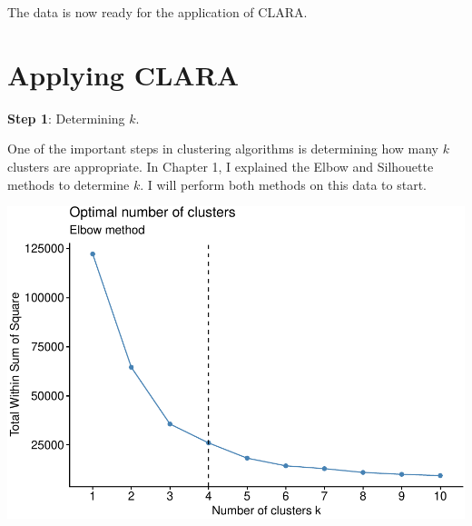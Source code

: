 \documentclass[12pt,twoside]{amherstthesis}
\begin{document}
  The data is now ready for the application of CLARA.
  
  \section{Applying CLARA}\label{applying-clara}
  
  \textbf{Step 1}: Determining \(k\).
  
  One of the important steps in clustering algorithms is determining how
  many \(k\) clusters are appropriate. In Chapter 1, I explained the Elbow
  and Silhouette methods to determine \(k\). I will perform both methods
  on this data to start.
  
  \begin{Shaded}
  \begin{Highlighting}[]
   \NormalTok{) }\OperatorTok{+}
  \StringTok{    }\NormalTok{(} \NormalTok{, } \NormalTok{)}\OperatorTok{+}
  \StringTok{  }\NormalTok{(} \NormalTok{)}
  \end{Highlighting}
  \end{Shaded}
  
  \begin{center}\includegraphics{Comps_Proj_files/figure-latex/unnamed-chunk-5-1} \end{center}
  
  \begin{Shaded}
  \begin{Highlighting}[]
   \NormalTok{) }\OperatorTok{+}
  \StringTok{  }\NormalTok{(} \NormalTok{)}
  \end{Highlighting}
  \end{Shaded}
  
\end{document}
